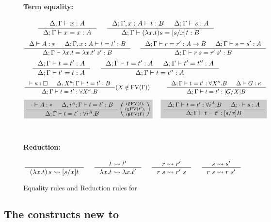 \begin{figure}
\begin{framed}
\paragraph{Term equality:} 
\[ \inference{\Delta;\Gamma |- x:A}{\Delta;\Gamma |- x=x:A}
 ~~~~
   \inference{\Delta;\Gamma,x:A |- t:B & \Delta;\Gamma |- s:A}
             {\Delta;\Gamma |- (\lambda x.t)s=[s/x]t : B}
\]
\[ \inference{\Delta |- A:* & \Delta;\Gamma,x:A |- t=t':B}
             {\Delta;\Gamma |- \lambda x.t = \lambda x.t'\;s':B}
 ~~~~
   \inference{\Delta;\Gamma |- r=r':A-> B & \Delta;\Gamma |- s=s':A}
             {\Delta;\Gamma |- r\;s=r'\;s':B}
\]
\[ \inference{\Delta;\Gamma |- t=t':A}{\Delta;\Gamma |- t'=t:A}
 ~~~~
   \inference{\Delta;\Gamma |- t=t':A & \Delta;\Gamma |- t'=t'':A}
             {\Delta;\Gamma |- t=t'':A}
\]
\[ \inference{|- \kappa:\square & \Delta, X^\kappa;\Gamma |- t=t' : B}
             {\Delta;\Gamma |- t=t' : \forall X^\kappa.B}
	     (X\notin\FV(\Gamma))
 ~~~~ ~~~~
   \inference{ \Delta;\Gamma |- t=t' : \forall X^\kappa.B
             & \Delta |- G:\kappa }
             {\Delta;\Gamma |- t=t' : [G/X]B}
\]
\[ \newFi{
   \inference{\cdot |- A:* & \Delta, i^A;\Gamma |- t=t' : B}
             {\Delta;\Gamma |- t=t' : \forall i^A.B}
   \left(\begin{smallmatrix}
		i\notin\FV(t),\\
		i\notin\FV(t'),\\
		i\notin\FV(\Gamma)\end{smallmatrix}\right) }
 ~~~~ \newFi{
   \inference{ \Delta;\Gamma |- t=t' : \forall i^A.B
             & \Delta;\cdot |- s:A}
             {\Delta;\Gamma |- t=t' : [s/x]B} }
\]
~\\
\paragraph{Reduction:} 
$ \inference{}{(\lambda x.t)\,s \rightsquigarrow [s/x]t}
 ~~~~
   \inference{t \rightsquigarrow t'}{\lambda x.t \rightsquigarrow \lambda x.t'}
 ~~~~
   \inference{r \rightsquigarrow r'}{r\;s \rightsquigarrow r'\;s}
 ~~~~
   \inference{s \rightsquigarrow s'}{r\;s \rightsquigarrow r\;s'}
$
\end{framed}
\caption{Equality rules and Reduction rules for \Fi}
\label{fig:eqFi}
\end{figure}

\subsection{The constructs new to \Fi}

